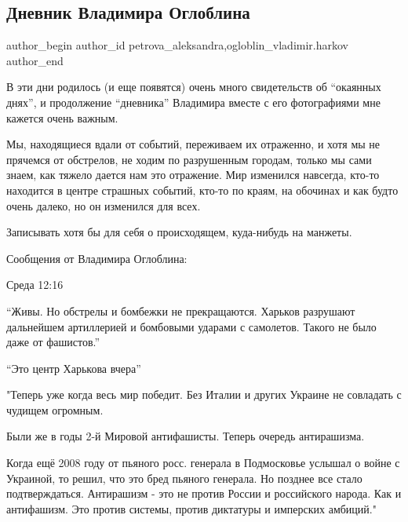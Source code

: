  
 
 
 
 
 
\subsection{Дневник Владимира Оглоблина}
\label{sec:05_03_2022.fb.petrova_aleksandra.1.dnevnik_ogloblin}
 
\ifcmt
 author_begin
   author_id petrova_aleksandra,ogloblin_vladimir.harkov
 author_end
\fi

В эти дни родилось (и еще появятся) очень много свидетельств об \enquote{окаянных
днях}, и продолжение \enquote{дневника} Владимира вместе с его фотографиями мне кажется
очень важным. 

Мы, находящиеся вдали от событий, переживаем их отраженно, и хотя мы не
прячемся от обстрелов, не ходим по разрушенным городам, только мы сами знаем,
как тяжело дается нам это отражение. Мир изменился навсегда, кто-то находится в
центре страшных событий, кто-то по краям, на обочинах и как будто очень далеко,
но он изменился для всех. 

Записывать хотя бы для себя о происходящем, куда-нибудь на манжеты.

Сообщения от Владимира Оглоблина:

Среда 12:16

\enquote{Живы. Но обстрелы и бомбежки не прекращаются. Харьков разрушают дальнейшем
артиллерией и бомбовыми ударами с самолетов. Такого не было даже от фашистов.}

\enquote{Это центр Харькова вчера}

"Теперь уже когда весь мир победит. Без Италии и других Украине не совладать с
чудищем огромным.

Были же в годы 2-й Мировой антифашисты. Теперь очередь антирашизма. 

Когда ещё 2008 году от пьяного росс. генерала в Подмосковье услышал о войне с
Украиной, то решил, что это бред пьяного генерала. Но позднее все стало
подтверждаться. Антирашизм - это не против России и российского народа. Как и
антифашизм. Это против системы, против диктатуры и имперских амбиций."

